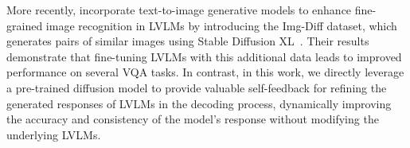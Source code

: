 More recently, \citet{jiao2024img} incorporate text-to-image generative models to enhance fine-grained image recognition in LVLMs by introducing the Img-Diff dataset, which generates pairs of similar images using Stable Diffusion XL~\citep{podell2024sdxl}. Their results demonstrate that fine-tuning LVLMs with this additional data leads to improved performance on several VQA tasks.
In contrast, in this work, we directly leverage a pre-trained diffusion model to provide valuable self-feedback for refining the generated responses of LVLMs in the decoding process, dynamically improving the accuracy and consistency of the model’s response without modifying the underlying LVLMs. 
